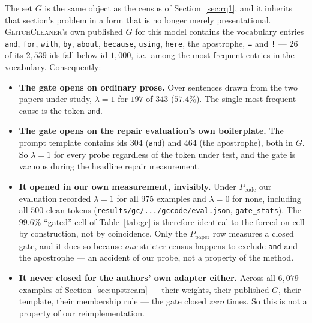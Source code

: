 \documentclass[11pt,a4paper]{article}
\newcommand{\gc}{\textsc{GlitchCleaner}}
\newcommand{\Ppaper}{$P_{\mathrm{paper}}$}
\newcommand{\Pcode}{$P_{\mathrm{code}}$}
\begin{document}
The set $G$ is the same object as the census of Section~\ref{sec:rq1}, and it
inherits that section's problem in a form that is no longer merely presentational.
\gc{}'s own published $G$ for this model contains the vocabulary entries
\texttt{and}, \texttt{for}, \texttt{with}, \texttt{by}, \texttt{about},
\texttt{because}, \texttt{using}, \texttt{here}, the apostrophe, \texttt{=} and
\texttt{!} --- $26$ of its $2{,}539$ ids fall below id $1{,}000$, i.e.\ among the
most frequent entries in the vocabulary. Consequently:

\begin{itemize}[leftmargin=*]
\item \textbf{The gate opens on ordinary prose.} Over sentences drawn from the two
papers under study, $\lambda = 1$ for $197$ of $343$ ($57.4\%$). The single most
frequent cause is the token \texttt{and}.
\item \textbf{The gate opens on the repair evaluation's own boilerplate.} The
prompt template contains ids $304$ (\texttt{and}) and $464$ (the apostrophe), both
in $G$. So $\lambda = 1$ for every probe regardless of the token under test, and
the gate is vacuous during the headline repair measurement.
\item \textbf{It opened in our own measurement, invisibly.} Under \Pcode{} our
evaluation recorded $\lambda = 1$ for all $975$ examples and $\lambda = 0$ for
none, including all $500$ clean tokens
(\texttt{results/gc/.../gccode/eval.json}, \texttt{gate\_stats}). The $99.6\%$
``gated'' cell of Table~\ref{tab:gc} is therefore identical to the forced-on cell
by construction, not by coincidence. Only the \Ppaper{} row measures a closed
gate, and it does so because \emph{our} stricter census happens to exclude
\texttt{and} and the apostrophe --- an accident of our probe, not a property of
the method.
\item \textbf{It never closed for the authors' own adapter either.} Across all
$6{,}079$ examples of Section~\ref{sec:upstream} --- their weights, their
published $G$, their template, their membership rule --- the gate closed
\emph{zero} times. So this is not a property of our reimplementation.
\end{itemize}
\end{document}
